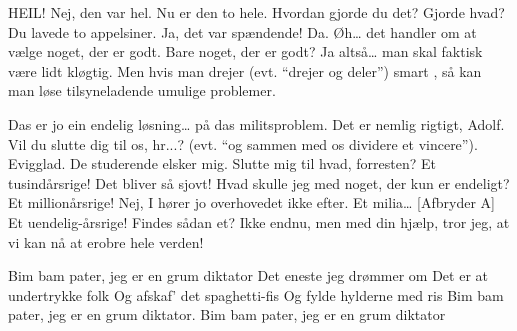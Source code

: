 \documentclass[a4paper,11pt]{article}
\begin{document}
\begin{sketch}

 HEIL!
 Nej, den var hel. Nu er den to hele.
 Hvordan gjorde du det?
 Gjorde hvad?
 Du lavede to appelsiner.
 Ja, det var spændende!
 Da.
 Øh… det handler om at vælge noget, der er godt.
 Bare noget, der er godt?
 Ja altså… man skal faktisk være lidt kløgtig. Men hvis man drejer (evt. “drejer og deler”) smart , så kan man løse tilsyneladende umulige problemer.

 Das er jo ein endelig løsning… på das militsproblem.
 Det er nemlig rigtigt, Adolf. Vil du slutte dig til os, hr...? (evt. “og sammen med os dividere et vincere”). 
 Evigglad. De studerende elsker mig. Slutte mig til hvad, forresten?
 Et tusindårsrige! Det bliver så sjovt!
 Hvad skulle jeg med noget, der kun er endeligt?
 Et millionårsrige!
 Nej, I hører jo overhovedet ikke efter.
 Et milia…
[Afbryder A] Et uendelig-årsrige!
 Findes sådan et?
 Ikke endnu, men med din hjælp, tror jeg, at vi kan nå at erobre hele verden!


 Bim bam pater, jeg er en grum diktator
Det eneste jeg drømmer om
Det er at undertrykke folk
Og afskaf’ det spaghetti-fis
Og fylde hylderne med ris
Bim bam pater, jeg er en grum diktator.
Bim bam pater, jeg er en grum diktator





\end{sketch}
\end{document}
